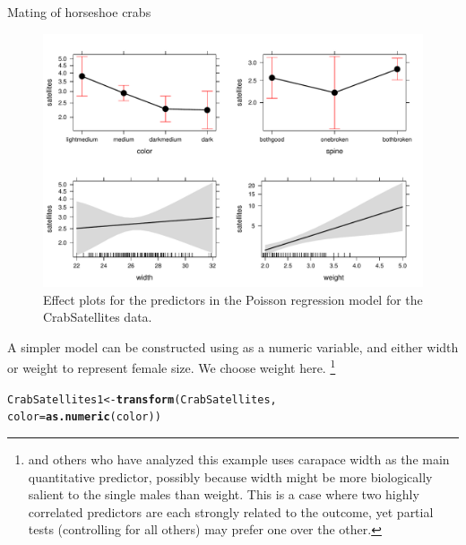 \documentclass[11pt]{book}\usepackage[]{graphicx}\usepackage[]{color}
\makeatletter
\newcommand{\hlstd}[1]{\textcolor[rgb]{0.345,0.345,0.345}{#1}}%
\newcommand{\hlkwb}[1]{\textcolor[rgb]{0.69,0.353,0.396}{#1}}%
\newcommand{\hlkwc}[1]{\textcolor[rgb]{0.333,0.667,0.333}{#1}}%
\newcommand{\hlkwd}[1]{\textcolor[rgb]{0.737,0.353,0.396}{\textbf{#1}}}%
\newenvironment{kframe}{%
 \def\at@end@of@kframe{}%
 \ifinner\ifhmode%
  \def\at@end@of@kframe{\end{minipage}}%
  \begin{minipage}{\columnwidth}%
 \fi\fi%
 \def\FrameCommand##1{\hskip\@totalleftmargin \hskip-\fboxsep
 \colorbox{shadecolor}{##1}\hskip-\fboxsep
     \hskip-\linewidth \hskip-\@totalleftmargin \hskip\columnwidth}%
 \MakeFramed {\advance\hsize-\width
   \@totalleftmargin\z@ \linewidth\hsize
   \@setminipage}}%
 {\par\unskip\endMakeFramed%
 \at@end@of@kframe}
\newenvironment{knitrout}{}{} %
\renewenvironment{knitrout}{\small\renewcommand{\baselinestretch}{.85}}{} %
\makeatother
\begin{document}
\begin{Example}[crabs1]{Mating of horseshoe crabs}
\begin{knitrout}
\begin{figure}[!htbp]
\centerline{\includegraphics[width=\textwidth]{ch09/fig/crabs1-eff1-1} }

\caption[Effect plots for the predictors in the Poisson regression model for the CrabSatellites data]{Effect plots for the predictors in the Poisson regression model for the CrabSatellites data.\label{fig:crabs1-eff1}}
\end{figure}


\end{knitrout}

A simpler model can be constructed using  as a numeric variable, and either width or
weight to represent female size. We choose weight here.%
\footnote{
\citet[\S 4.3]{Agresti:2013} and others who have analyzed this example uses carapace width
as the main quantitative predictor, possibly because width might be more biologically salient
to the single males than weight.  This is a case where two
highly correlated predictors are each strongly related to the outcome,
yet partial tests (controlling for all others) may prefer one over the other.
}
\begin{knitrout}
\color{fgcolor}\begin{kframe}
\begin{alltt}
\hlstd{CrabSatellites1} \hlkwb{<-} \hlkwd{transform}\hlstd{(CrabSatellites,}
  \hlkwc{color} \hlstd{=} \hlkwd{as.numeric}\hlstd{(color))}


\end{alltt}
\end{kframe}
\end{knitrout}
\end{Example}
\end{document}
